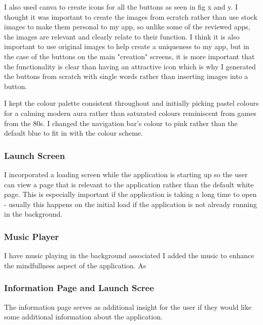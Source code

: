 \documentclass[11pt]{article}
\begin{document}
            I also used canva to create icons for all the buttons as  seen in fig x and y. I thought it was important to create the images from scratch rather than use stock images to make them personal to my app, so unlike some of the reviewed apps, the images are relevant and clearly relate to their function. I think it is also important to use original images to help create a uniqueness to my app, but in the case of the buttons on the main "creation" screens, it is more important that the functionality is clear than having an attractive icon which is why I generated the buttons from scratch with single words rather than inserting images into a button.
            
            I kept the colour palette consistent throughout and initially picking pastel colours for a calming modern  aura rather than saturated colours reminiscent from games from the 80s. I changed the navigation bar's colour to pink rather than the default blue to fit in with the colour scheme. 
    

                 \subsubsection{Launch Screen}
                I incorporated a loading screen while the application is starting up so the user can view a page that is relevant to the application rather than the default white page. This is especially important if the application is taking a long time to open - usually this happens on the initial load if the application is not already running in the background.
                
                 \subsubsection{Music Player}
                I have music playing in the background associated
                I added the music to enhance the mindfullness aspect of the application. As 
                
                
                 \subsubsection{Information Page and Launch Scree}
                
                The information page serves as additional insight for the user if they would like some additional information about the application. 
\end{document}
